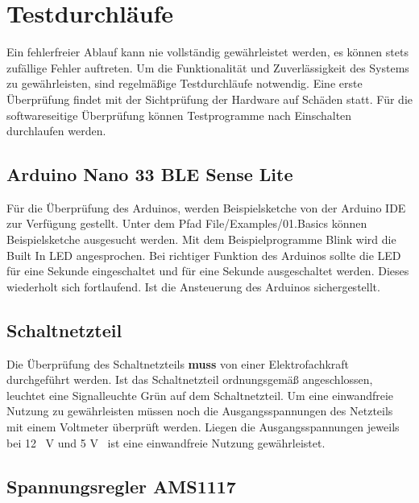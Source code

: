 %
%
%
\chapter{Testdurchläufe}

Ein fehlerfreier Ablauf kann nie vollständig gewährleistet werden, es können stets zufällige Fehler auftreten. Um die Funktionalität und Zuverlässigkeit des Systems zu gewährleisten, sind regelmäßige Testdurchläufe notwendig. Eine erste Überprüfung findet mit der Sichtprüfung der Hardware auf Schäden statt. Für die softwareseitige Überprüfung können Testprogramme nach Einschalten durchlaufen werden.  


\section{Arduino Nano 33 BLE Sense Lite}

Für die Überprüfung des Arduinos, werden Beispielsketche von der Arduino IDE zur Verfügung gestellt. Unter dem Pfad File/Examples/01.Basics können Beispielsketche ausgesucht werden. Mit dem Beispielprogramme Blink wird die Built In LED angesprochen. Bei richtiger Funktion des Arduinos sollte die LED für eine Sekunde eingeschaltet und für eine Sekunde ausgeschaltet werden. Dieses wiederholt sich fortlaufend. Ist die Ansteuerung des Arduinos sichergestellt. 

%
%

\section{Schaltnetzteil}

Die Überprüfung des Schaltnetzteils \textbf{muss} von einer Elektrofachkraft durchgeführt werden. Ist das Schaltnetzteil ordnungsgemäß angeschlossen, leuchtet eine Signalleuchte Grün auf dem Schaltnetzteil. Um eine einwandfreie Nutzung zu gewährleisten müssen noch die Ausgangsspannungen des Netzteils mit einem Voltmeter überprüft werden. Liegen die Ausgangsspannungen jeweils bei 12 \ V und 5 V \ ist eine einwandfreie Nutzung gewährleistet. 


\section{Spannungsregler AMS1117}

